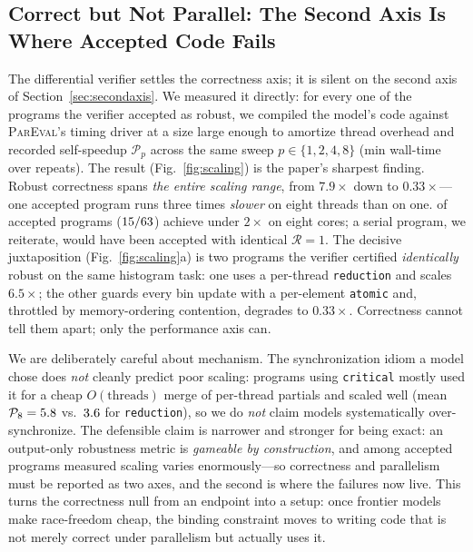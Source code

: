 \subsection{Correct but Not Parallel: The Second Axis Is Where Accepted Code Fails}
\label{sec:scaling}
The differential verifier settles the correctness axis; it is silent on the second
axis of Section~\ref{sec:secondaxis}. We measured it directly: for every one of the
\Ntimed{} programs the verifier accepted as robust, we compiled the model's code
against \textsc{ParEval}'s timing driver at a size large enough to amortize thread
overhead and recorded self-speedup $\mathcal{P}_p$ across the same sweep
$p\in\{1,2,4,8\}$ (min wall-time over repeats). The result (Fig.~\ref{fig:scaling})
is the paper's sharpest finding. Robust correctness spans \emph{the entire scaling
range}, from $7.9\times$ down to $0.33\times$---one accepted program runs three
times \emph{slower} on eight threads than on one. \PctFlatScale{} of accepted
programs ($15{}/63{}$) achieve under $2\times$ on eight cores; a
serial program, we reiterate, would have been accepted with identical
$\mathcal{R}{=}1$. The decisive juxtaposition (Fig.~\ref{fig:scaling}a) is two
programs the verifier certified \emph{identically} robust on the same histogram
task: one uses a per-thread \texttt{reduction} and scales $6.5\times$; the other
guards every bin update with a per-element \texttt{atomic} and, throttled by
memory-ordering contention, degrades to $0.33\times$. Correctness cannot tell them
apart; only the performance axis can.

We are deliberately careful about mechanism. The synchronization idiom a model
chose does \emph{not} cleanly predict poor scaling: programs using
\texttt{critical} mostly used it for a cheap $O(\text{threads})$ merge of
per-thread partials and scaled well (mean $\mathcal{P}_8=5.8{}$ vs.\
$3.6{}$ for \texttt{reduction}), so we do \emph{not} claim models
systematically over-synchronize. The defensible claim is narrower and stronger for
being exact: an output-only robustness metric is \emph{gameable by construction},
and among accepted programs measured scaling varies enormously---so correctness and
parallelism must be reported as two axes, and the second is where the failures now
live. This turns the correctness null from an endpoint into a setup: once frontier
models make race-freedom cheap, the binding constraint moves to writing code that
is not merely correct under parallelism but actually uses it.

